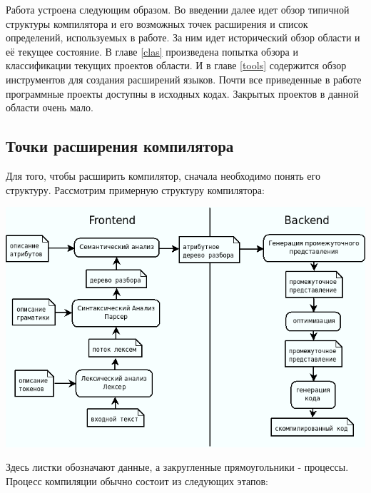 \documentclass[a4paper,12pt]{article}
\begin{document}
Работа устроена следующим образом. Во введении далее идет обзор типичной
структуры компилятора и его возможных точек расширения и список определений,
используемых в работе. За ним идет исторический обзор области и её текущее
состояние. В главе \ref{clas} произведена попытка обзора и классификации текущих
проектов области. И в главе \ref{tools} содержится обзор инструментов для
создания расширений языков. Почти все приведенные в работе программные проекты
доступны в исходных кодах. Закрытых проектов в данной области очень мало.

\subsection{Точки расширения компилятора}
Для того, чтобы расширить компилятор, сначала необходимо понять его структуру.
Рассмотрим примерную структуру компилятора:
\begin{center}
 \includegraphics[scale=0.6]{img/compiler2.png}
\end{center}
Здесь листки обозначают данные, а закругленные прямоугольники - процессы.
\newline \newline
Процесс компиляции обычно состоит из следующих этапов:
\end{document}
